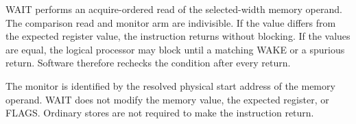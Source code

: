 WAIT performs an acquire-ordered read of the selected-width memory operand. The comparison read and monitor arm
are indivisible. If the value differs from the expected register value, the instruction returns without blocking.
If the values are equal, the logical processor may block until a matching WAKE or a spurious return. Software
therefore rechecks the condition after every return.

The monitor is identified by the resolved physical start address of the memory operand. WAIT does not modify the
memory value, the expected register, or FLAGS. Ordinary stores are not required to make the instruction return.
